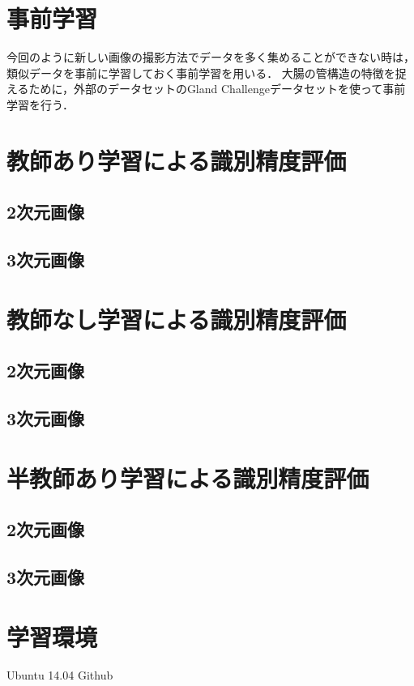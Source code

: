 \section{事前学習}
今回のように新しい画像の撮影方法でデータを多く集めることができない時は，類似データを事前に学習しておく事前学習を用いる．
大腸の管構造の特徴を捉えるために，外部のデータセットのGland Challengeデータセットを使って事前学習を行う．

\section{教師あり学習による識別精度評価}
\subsection*{2次元画像}
\subsection*{3次元画像}

\section{教師なし学習による識別精度評価}
\subsection*{2次元画像}
\subsection*{3次元画像}

\section{半教師あり学習による識別精度評価}
\subsection*{2次元画像}
\subsection*{3次元画像}

\section{学習環境}
Ubuntu 14.04
Github
